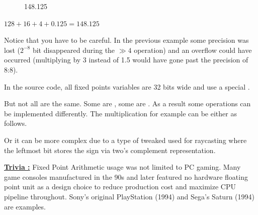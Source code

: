 \begin{figure}[H]
 \centering
   
   \caption{148.125} 
\end{figure} 
$128 + 16 + 4 + 0.125 = 148.125 $\\
\par
Notice that you have to be careful. In the previous example some precision was lost ($ 2^{-8}$ bit disappeared during the $\gg 4$ operation) and an overflow could have occurred (multiplying by 3 instead of 1.5 would have gone past the precision of 8:8).\\
\par
In the source code, all fixed points variables are 32 bits wide and use a special .\\
\par
\begin{minipage}{\textwidth}
 
 \end{minipage}
\par
But not all  are the same. Some are , some are . As a result some operations can be implemented differently. The multiplication for example can be either as follows.\\
\par
\begin{minipage}{\textwidth}
 
 \end{minipage}
\par
Or it can be more complex due to a type of tweaked  used for raycasting where the leftmost bit stores the sign via two's complement representation.\\
\par
\begin{minipage}{\textwidth}
 
 \end{minipage}
\par


 \textbf{\underline{Trivia :}}  Fixed Point Arithmetic usage was not limited to PC gaming. Many game consoles manufactured in the 90s and later featured no hardware floating point unit as a design choice to reduce production cost and maximize CPU pipeline throughout. Sony's original PlayStation (1994) and Sega's Saturn (1994) are examples.
 

 
 


